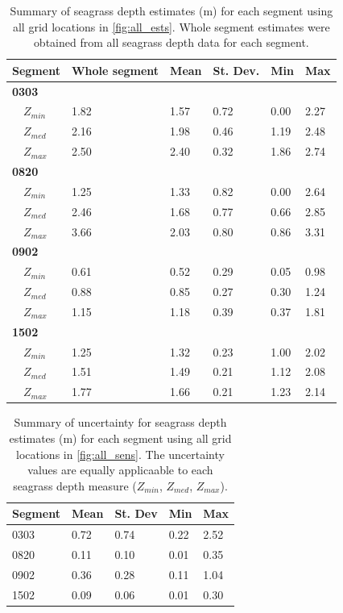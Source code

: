 \documentclass[letterpaper,12pt,oneside]{article}\usepackage[]{graphicx}\usepackage[]{color}
\begin{document}
\begin{table}[!tbp]
\caption{Summary of seagrass depth estimates (m) for each segment using all grid locations in \cref{fig:all_ests}.  Whole segment estimates were obtained from all seagrass depth data for each segment.\label{tab:est_summ}} 
\begin{center}
\begin{tabular}{llllll}
\hline\hline
\multicolumn{1}{l}{{\bf Segment}}&\multicolumn{1}{c}{Whole segment}&\multicolumn{1}{c}{Mean}&\multicolumn{1}{c}{St. Dev.}&\multicolumn{1}{c}{Min}&\multicolumn{1}{c}{Max}\tabularnewline
\hline
{\bfseries 0303}&&&&&\tabularnewline
~~$Z_{min}$&1.82&1.57&0.72&0.00&2.27\tabularnewline
~~$Z_{med}$&2.16&1.98&0.46&1.19&2.48\tabularnewline
~~$Z_{max}$&2.50&2.40&0.32&1.86&2.74\tabularnewline
\hline
{\bfseries 0820}&&&&&\tabularnewline
~~$Z_{min}$&1.25&1.33&0.82&0.00&2.64\tabularnewline
~~$Z_{med}$&2.46&1.68&0.77&0.66&2.85\tabularnewline
~~$Z_{max}$&3.66&2.03&0.80&0.86&3.31\tabularnewline
\hline
{\bfseries 0902}&&&&&\tabularnewline
~~$Z_{min}$&0.61&0.52&0.29&0.05&0.98\tabularnewline
~~$Z_{med}$&0.88&0.85&0.27&0.30&1.24\tabularnewline
~~$Z_{max}$&1.15&1.18&0.39&0.37&1.81\tabularnewline
\hline
{\bfseries 1502}&&&&&\tabularnewline
~~$Z_{min}$&1.25&1.32&0.23&1.00&2.02\tabularnewline
~~$Z_{med}$&1.51&1.49&0.21&1.12&2.08\tabularnewline
~~$Z_{max}$&1.77&1.66&0.21&1.23&2.14\tabularnewline
\hline
\end{tabular}\end{center}

\end{table}


\begin{table}[!tbp]
\caption{Summary of uncertainty for seagrass depth estimates (m) for each segment using all grid locations in \cref{fig:all_sens}.  The uncertainty values are equally applicaable to each seagrass depth measure ($Z_{min}$, $Z_{med}$, $Z_{max}$).\label{tab:sens_summ}} 
\begin{center}
\begin{tabular}{lllll}
\hline\hline
\multicolumn{1}{l}{Segment}&\multicolumn{1}{c}{Mean}&\multicolumn{1}{c}{St. Dev}&\multicolumn{1}{c}{Min}&\multicolumn{1}{c}{Max}\tabularnewline
\hline
0303&0.72&0.74&0.22&2.52\tabularnewline
0820&0.11&0.10&0.01&0.35\tabularnewline
0902&0.36&0.28&0.11&1.04\tabularnewline
1502&0.09&0.06&0.01&0.30\tabularnewline
\hline
\end{tabular}\end{center}

\end{table}
\end{document}

